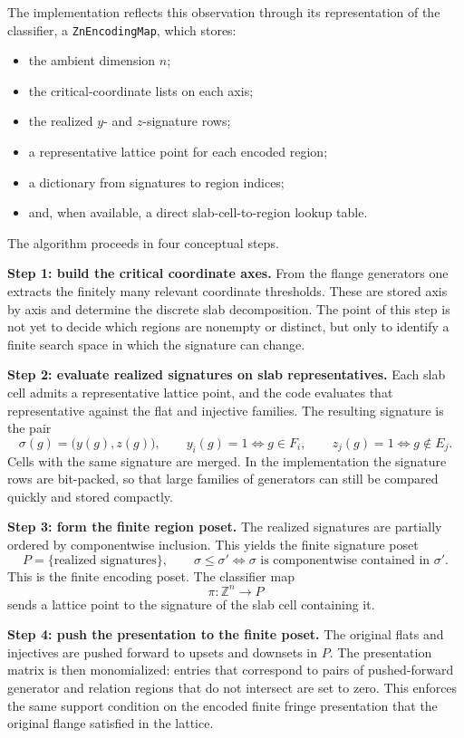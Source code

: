 \documentclass[11pt]{article}
\newcommand{\Z}{\mathbb{Z}}
\theoremstyle{definition}
\theoremstyle{remark}
\begin{document}
The implementation reflects this observation through its representation of the classifier, a \texttt{ZnEncodingMap}, which stores:
\begin{itemize}[leftmargin=1.5em]
	\item the ambient dimension $n$;
	\item the critical-coordinate lists on each axis;
	\item the realized $y$- and $z$-signature rows;
	\item a representative lattice point for each encoded region;
	\item a dictionary from signatures to region indices;
	\item and, when available, a direct slab-cell-to-region lookup table.
\end{itemize}

The algorithm proceeds in four conceptual steps.

\smallskip
\textbf{Step 1: build the critical coordinate axes.}
From the flange generators one extracts the finitely many relevant coordinate thresholds.  These are stored axis by axis and determine the discrete slab decomposition.  The point of this step is not yet to decide which regions are nonempty or distinct, but only to identify a finite search space in which the signature can change.

\smallskip
\textbf{Step 2: evaluate realized signatures on slab representatives.}
Each slab cell admits a representative lattice point, and the code evaluates that representative against the flat and injective families.  The resulting signature is the pair
\[
\sigma(g)= \bigl(y(g),z(g) \bigr),
\qquad
y_i(g)=1 \iff g\in F_i,
\qquad
z_j(g)=1 \iff g \notin E_j.
\]
Cells with the same signature are merged.  In the implementation the signature rows are bit-packed, so that large families of generators can still be compared quickly and stored compactly.

\smallskip
\textbf{Step 3: form the finite region poset.}
The realized signatures are partially ordered by componentwise inclusion.  This yields the finite signature poset
\[
P= \{ \text{realized signatures}\},
\qquad
\sigma \leq \sigma' \iff \sigma \text{ is componentwise contained in } \sigma'.
\]
This is the finite encoding poset.  The classifier map
\[
\pi : \Z^n \to P
\]
sends a lattice point to the signature of the slab cell containing it.

\smallskip
\textbf{Step 4: push the presentation to the finite poset.}
The original flats and injectives are pushed forward to upsets and downsets in $P$.  The presentation matrix is then monomialized: entries that correspond to pairs of pushed-forward generator and relation regions that do not intersect are set to zero.  This enforces the same support condition on the encoded finite fringe presentation that the original flange satisfied in the lattice.
\end{document}
